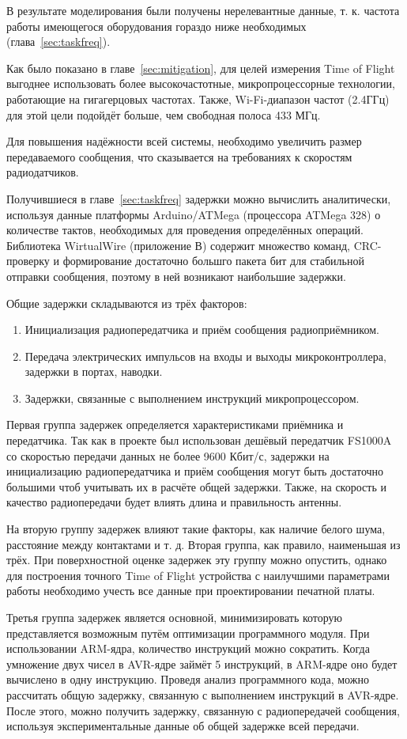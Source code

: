 В результате моделирования были получены нерелевантные данные, т. к. частота работы имеющегося оборудования гораздо ниже необходимых (глава~\ref{sec:taskfreq}).

Как было показано в главе~\ref{sec:mitigation}, для целей измерения Time of Flight выгоднее использовать более высокочастотные, микропроцессорные технологии, работающие на гигагерцовых частотах. Также, Wi-Fi-диапазон частот (2.4ГГц) для этой цели подойдёт больше, чем свободная полоса 433 МГц.

Для повышения надёжности всей системы, необходимо увеличить размер передаваемого сообщения, что сказывается на требованиях к скоростям радиодатчиков.

Получившиеся в главе~\ref{sec:taskfreq} задержки можно вычислить аналитически, используя данные платформы Arduino/ATMega (процессора ATMega 328) о количестве тактов, необходимых для проведения определённых операций. Библиотека WirtualWire (приложение В) содержит множество команд, CRC-проверку и формирование достаточно большго пакета бит для стабильной отправки сообщения, поэтому в ней возникают наибольшие задержки.

Общие задержки складываются из трёх факторов:

\begin{enumerate}
    \item Инициализация радиопередатчика и приём сообщения радиоприёмником.
    \item Передача электрических импульсов на входы и выходы микроконтроллера, задержки в портах, наводки.
    \item Задержки, связанные с выполнением инструкций микропроцессором.
\end{enumerate}

Первая группа задержек определяется характеристиками приёмника и передатчика. Так как в проекте был использован дешёвый передатчик FS1000A со скоростью передачи данных не более 9600 Кбит/с, задержки на инициализацию радиопередатчика и приём сообщения могут быть достаточно большими чтоб учитывать их в расчёте общей задержки. Также, на скорость и качество радиопередачи будет влиять длина и правильность антенны.

На вторую группу задержек влияют такие факторы, как наличие белого шума, расстояние между контактами и т. д. Вторая группа, как правило, наименьшая из трёх. При поверхностной оценке задержек эту группу можно опустить, однако для построения точного Time of Flight устройства с наилучшими параметрами работы необходимо учесть все данные при проектировании печатной платы.

Третья группа задержек является основной, минимизировать которую представляется возможным путём оптимизации программного модуля. При использовании ARM-ядра, количество инструкций можно сократить. Когда умножение двух чисел в AVR-ядре займёт 5 инструкций, в ARM-ядре оно будет вычислено в одну инструкцию. Проведя анализ программного кода, можно рассчитать общую задержку, связанную с выполнением инструкций в AVR-ядре. После этого, можно получить задержку, связанную с радиопередачей сообщения, используя экспериментальные данные об общей задержке всей передачи.
